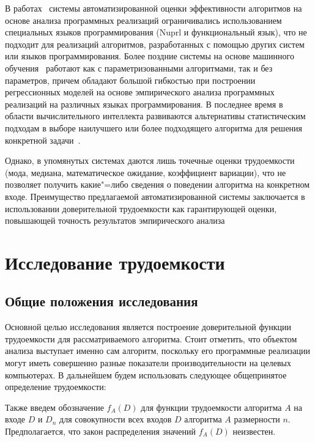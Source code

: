 \documentclass[a4paper, article, 14pt]{extarticle}
\begin{document}
В работах~\cite{functional_nuprl, functional_automation} системы автоматизированной оценки эффективности алгоритмов на основе анализа программных реализаций ограничивались использованием специальных языков программирования (Nuprl и функциональный язык), что не подходит для реализаций алгоритмов, разработанных с помощью других систем или языков программирования. Более поздние системы на основе машинного обучения~\cite{runtime_prediction} работают как с параметризованными алгоритмами, так и без параметров, причем обладают большой гибкостью при построении регрессионных моделей на основе эмпирического анализа программных реализаций на различных языках программирования. В последнее время в области вычислительного интеллекта развиваются альтернативы статистическим подходам в выборе наилучшего или более подходящего алгоритма для решения конкретной задачи~\cite{intelligence_forecasting}.

Однако, в упомянутых системах даются лишь точечные оценки трудоемкости (мода, медиана, математическое ожидание, коэффициент вариации), что не позволяет получить какие"=либо сведения о поведении алгоритма на конкретном входе. Преимущество предлагаемой автоматизированной системы заключается в использовании доверительной трудоемкости как гарантирующей оценки, повышающей точность результатов эмпирического анализа

\section{Исследование трудоемкости}\label{sec:complexity_research}

\subsection{Общие положения исследования}\label{sec:common_definitions}

Основной целью исследования является построение доверительной функции трудоемкости для рассматриваемого алгоритма. Стоит отметить, что объектом анализа выступает именно сам алгоритм, поскольку его программные реализации могут иметь совершенно разные показатели производительности на целевых компьютерах. В дальнейшем будем использовать следующее общепринятое определение трудоемкости:


Также введем обозначение $f_A(D)$ для функции трудоемкости алгоритма $A$ на входе $D$ и $D_n$ для совокупности всех входов $D$ алгоритма $A$ размерности $n$. Предполагается, что закон распределения значений $f_A(D)$ неизвестен.
\end{document}
